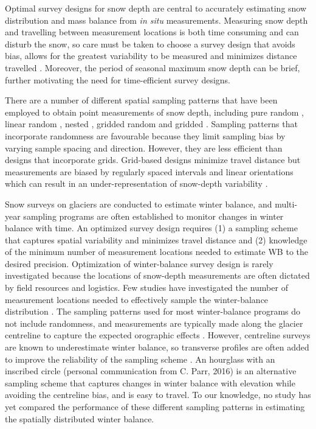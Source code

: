 \documentclass{article}
\begin{document}
Optimal survey designs for snow depth are central to accurately estimating snow distribution and mass balance from \textit{in situ} measurements. Measuring snow depth and travelling between measurement locations is both time consuming and can disturb the snow, so care must be taken to choose a survey design that avoids bias, allows for the greatest variability to be measured and minimizes distance travelled  \parencite[e.g.][]{Shea2010,Kinar2015}. Moreover, the period of seasonal maximum snow depth can be brief, further motivating the need for time-efficient survey designs. 


There are a number of different spatial sampling patterns that have been employed to obtain point measurements of snow depth, including pure random  \parencite[e.g.][]{Elder1991}, linear random \parencite[e.g.][]{Shea2010}, nested  \parencite[e.g.][]{Schweizer2008}, gridded random  \parencite[e.g.][]{Bellaire2008, Elder2009, Bellaire2011} and gridded  \parencite[e.g.][]{Molotch2005a, Kronholm2007, Lopez2011}. Sampling patterns that incorporate randomness are favourable because they limit sampling bias by varying sample spacing and direction. However, they are less efficient than designs that incorporate grids. Grid-based designs minimize travel distance but measurements are biased by regularly spaced intervals and linear orientations which can result in an under-representation of  snow-depth variability  \parencite{Kronholm2007}.

Snow surveys on glaciers are conducted to estimate winter balance, and multi-year sampling programs are often established to monitor changes in winter balance with time. An optimized survey design requires (1) a sampling scheme that captures spatial variability and minimizes travel distance and (2) knowledge of the minimum number of measurement locations needed to estimate WB to the desired precision. 
Optimization of winter-balance survey design is rarely investigated because the locations of snow-depth measurements are often dictated by field resources and logistics. Few studies have investigated the number of measurement locations needed to effectively sample the winter-balance distribution  \parencite[c.f.][]{Fountain1999,Walmsley2015}. The sampling patterns used for most winter-balance programs do not include randomness, and measurements are typically made along the glacier centreline  \parencite[e.g.][]{Kaser2003} to capture the expected orographic effects  \parencite[e.g.][]{Grunewald2014}. However, centreline surveys are known to underestimate winter balance, so transverse profiles are often added to improve the reliability of the sampling scheme  \parencite[e.g.][]{Walmsley2015}. An hourglass with an inscribed circle (personal communication from C. Parr, 2016) is an alternative sampling scheme that captures changes in winter balance with elevation while avoiding the centreline bias, and is easy to travel. To our knowledge, no study has yet compared the performance of these different sampling patterns in estimating the spatially distributed winter balance.
\end{document}
